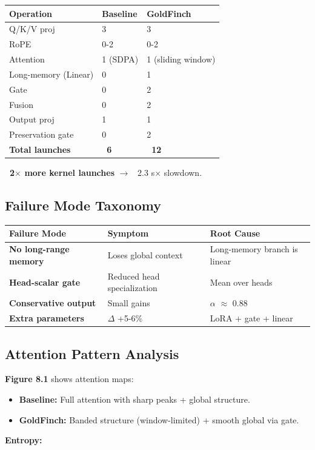 \begin{table}[H]
\centering
\small
\begin{tabular}{lll}
\toprule
\textbf{Operation} & \textbf{Baseline} & \textbf{GoldFinch} \\
\midrule
Q/K/V proj & 3 & 3 \\
RoPE & 0-2 & 0-2 \\
Attention & 1 (SDPA) & 1 (sliding window) \\
Long-memory (Linear) & 0 & 1 \\
Gate & 0 & 2 \\
Fusion & 0 & 2 \\
Output proj & 1 & 1 \\
Preservation gate & 0 & 2 \\
\textbf{Total launches} & \textbf{~6} & \textbf{~12} \\
\bottomrule
\end{tabular}
\end{table}

\textbf{~2$\times$ more kernel launches} $\to$ ~2.3 s$\times$ slowdown.

\subsection{Failure Mode Taxonomy}

\begin{table}[H]
\centering
\small
\begin{tabular}{lll}
\toprule
\textbf{Failure Mode} & \textbf{Symptom} & \textbf{Root Cause} \\
\midrule
\textbf{No long-range memory} & Loses global context & Long-memory branch is linear \\
\textbf{Head-scalar gate} & Reduced head specialization & Mean over heads \\
\textbf{Conservative output} & Small gains & $\alpha$ $\approx$ 0.88 \\
\textbf{Extra parameters} & $\Delta$ +5-6\% & LoRA + gate + linear \\
\bottomrule
\end{tabular}
\end{table}

\subsection{Attention Pattern Analysis}

\textbf{Figure 8.1} shows attention maps:

\begin{itemize}
\item \textbf{Baseline:} Full attention with sharp peaks + global structure.
\item \textbf{GoldFinch:} Banded structure (window-limited) + smooth global via gate.

\end{itemize}
\textbf{Entropy:}

